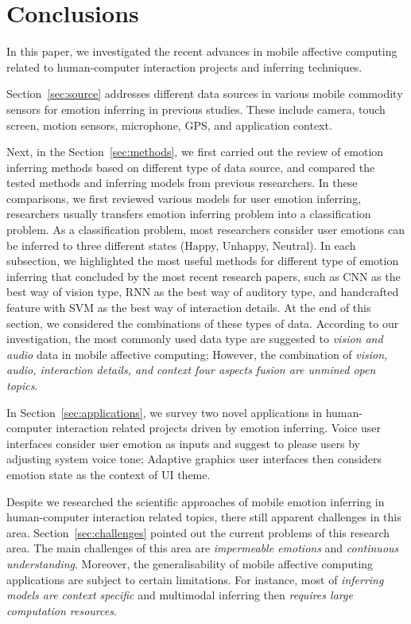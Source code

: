 \section{Conclusions}
\label{sec:conclusion}

In this paper, we investigated the recent advances in mobile affective computing related to human-computer interaction projects and inferring techniques.

Section~\ref{sec:source} addresses different data sources in various mobile commodity sensors for emotion inferring in previous studies. These include camera, touch screen, motion sensors, microphone, GPS, and application context. 

Next, in the Section~\ref{sec:methods}, 
we first carried out the review of emotion inferring methods based on different type of data source, and compared the tested methods and inferring models from previous researchers. In these comparisons, we first reviewed various models for user emotion inferring, researchers usually transfers emotion inferring problem into a classification problem. As a classification problem, most researchers consider user emotions can be inferred to three different states (Happy, Unhappy, Neutral). In each subsection, we highlighted the most useful methods for different type of emotion inferring that concluded by the most recent research papers, such as CNN as the best way of vision type, RNN as the best way of auditory type, and handcrafted feature with SVM as the best way of interaction details. At the end of this section, we considered the combinations of these types of data. According to our investigation, the most commonly used data type are suggested to \emph{vision and audio} data in mobile affective computing; However, the combination of \emph{vision, audio, interaction details, and context four aspects fusion are unmined open topics}.

In Section~\ref{sec:applications}, we survey two novel applications in human-computer interaction related projects driven by emotion inferring. Voice user interfaces consider user emotion as inputs and suggest to please users by adjusting system voice tone; Adaptive graphics user interfaces then considers emotion state as the context of UI theme.

Despite we researched the scientific approaches of mobile emotion inferring in human-computer interaction related topics, there still apparent challenges in this area. Section~\ref{sec:challenges} pointed out the current problems of this research area. The main challenges of this area are \emph{impermeable emotions} and \emph{continuous understanding}. Moreover, the generalisability of mobile affective computing applications are subject to certain limitations. For instance, most of \emph{inferring models are context specific} and multimodal inferring then \emph{requires large computation resources}.

